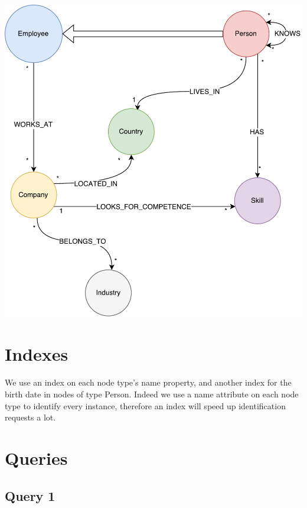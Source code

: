\documentclass[a4paper, 11pt, titlepage]{article}
\begin{document}
\begin{center}
\includegraphics[scale=0.25]{res/database.pdf}
\end{center}


\section {Indexes}


We use an index on each node type's name property, and another index for the birth date in nodes of type Person. Indeed we use a name attribute on each node type to identify every instance, therefore an index will speed up identification requests a lot.


\section {Queries}

\subsection {Query 1}
\end{document}
